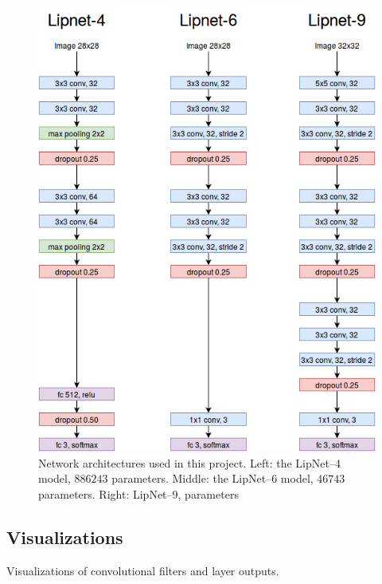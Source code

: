 \documentclass[a4paper, 11pt, table]{article}
\begin{document}
\begin{figure}[H]
\centering
\includegraphics[width=\textwidth]{lipnet_architecture_3.png} 
\caption{Network architectures used in this project. Left: the LipNet--4 model, $886243$ parameters. Middle: the LipNet--6 model, $46743$ parameters. Right: LipNet--9, parameters}
\label{fig:lipnet_arch}
\end{figure}

\newpage


\subsection{Visualizations}

Visualizations of convolutional filters and layer outputs.
\end{document}
